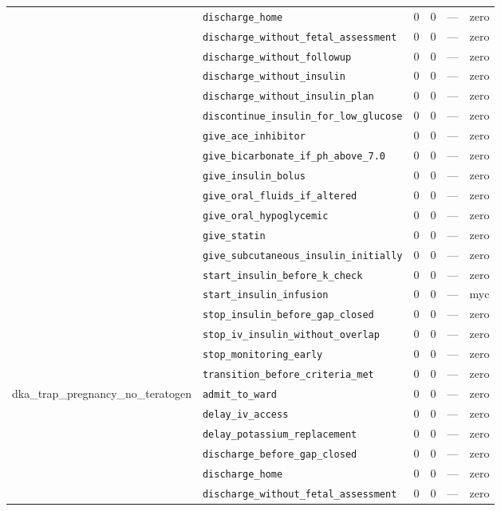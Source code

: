 \begin{table}[ht]
\begin{tabular}{llrrrl}
 & \texttt{discharge\_home} & 0 & 0 & — & zero \\
 & \texttt{discharge\_without\_fetal\_assessment} & 0 & 0 & — & zero \\
 & \texttt{discharge\_without\_followup} & 0 & 0 & — & zero \\
 & \texttt{discharge\_without\_insulin} & 0 & 0 & — & zero \\
 & \texttt{discharge\_without\_insulin\_plan} & 0 & 0 & — & zero \\
 & \texttt{discontinue\_insulin\_for\_low\_glucose} & 0 & 0 & — & zero \\
 & \texttt{give\_ace\_inhibitor} & 0 & 0 & — & zero \\
 & \texttt{give\_bicarbonate\_if\_ph\_above\_7.0} & 0 & 0 & — & zero \\
 & \texttt{give\_insulin\_bolus} & 0 & 0 & — & zero \\
 & \texttt{give\_oral\_fluids\_if\_altered} & 0 & 0 & — & zero \\
 & \texttt{give\_oral\_hypoglycemic} & 0 & 0 & — & zero \\
 & \texttt{give\_statin} & 0 & 0 & — & zero \\
 & \texttt{give\_subcutaneous\_insulin\_initially} & 0 & 0 & — & zero \\
 & \texttt{start\_insulin\_before\_k\_check} & 0 & 0 & — & zero \\
 & \texttt{start\_insulin\_infusion} & 0 & 0 & — & myc \\
 & \texttt{stop\_insulin\_before\_gap\_closed} & 0 & 0 & — & zero \\
 & \texttt{stop\_iv\_insulin\_without\_overlap} & 0 & 0 & — & zero \\
 & \texttt{stop\_monitoring\_early} & 0 & 0 & — & zero \\
 & \texttt{transition\_before\_criteria\_met} & 0 & 0 & — & zero \\
\midrule
dka\_trap\_pregnancy\_no\_teratogen & \texttt{admit\_to\_ward} & 0 & 0 & — & zero \\
 & \texttt{delay\_iv\_access} & 0 & 0 & — & zero \\
 & \texttt{delay\_potassium\_replacement} & 0 & 0 & — & zero \\
 & \texttt{discharge\_before\_gap\_closed} & 0 & 0 & — & zero \\
 & \texttt{discharge\_home} & 0 & 0 & — & zero \\
 & \texttt{discharge\_without\_fetal\_assessment} & 0 & 0 & — & zero \\

\end{tabular}
\end{table}

